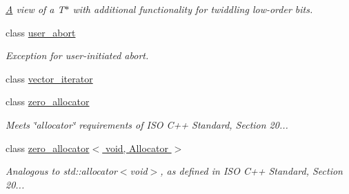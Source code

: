 \begin{DoxyCompactItemize}
\begin{DoxyCompactList}\small\item\em \hyperlink{structA}{A} view of a T$\ast$ with additional functionality for twiddling low-\/order bits. \end{DoxyCompactList}\item 
class \hyperlink{classtbb_1_1user__abort}{user\+\_\+abort}
\begin{DoxyCompactList}\small\item\em Exception for user-\/initiated abort. \end{DoxyCompactList}\item 
class \hyperlink{classtbb_1_1vector__iterator}{vector\+\_\+iterator}
\item 
class \hyperlink{classtbb_1_1zero__allocator}{zero\+\_\+allocator}
\begin{DoxyCompactList}\small\item\em Meets \char`\"{}allocator\char`\"{} requirements of I\+S\+O C++ Standard, Section 20... \end{DoxyCompactList}\item 
class \hyperlink{classtbb_1_1zero__allocator_3_01void_00_01Allocator_01_4}{zero\+\_\+allocator$<$ void, Allocator $>$}
\begin{DoxyCompactList}\small\item\em Analogous to std\+::allocator$<$void$>$, as defined in I\+S\+O C++ Standard, Section 20... \end{DoxyCompactList}\end{DoxyCompactItemize}
